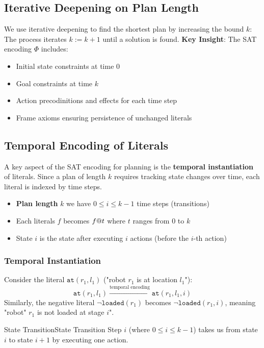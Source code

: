 \documentclass[a4paper]{article}
\theoremstyle{definition}
\begin{document}
\subsection{Iterative Deepening on Plan Length}
We use iterative deepening to find the shortest plan by increasing the bound \( k \):
The process iterates \( k := k + 1 \) until a solution is found. 
\vspace{1em}
\noindent
\newline
\textbf{Key Insight}: The SAT encoding \( \Phi \) includes:
\begin{itemize}
    \item Initial state constraints at time 0 
    \item Goal constraints at time \( k \)     
    \item Action precodinitions and effects for each time step 
    \item Frame axioms ensuring persistence of unchanged literals
\end{itemize}
\subsection{Temporal Encoding of Literals}
A key aspect of the SAT encoding for planning is the \textbf{temporal instantiation} of literals. Since a plan of length \( k \) requires tracking 
state changes over time, each literal is indexed by time steps.
\begin{itemize}
    \item \textbf{Plan length} \( k \) we have \( 0 \leq i \leq k - 1 \) time steps (transitions)
    \item Each literals \( f \) becomes \( f\symbol{64}t \) where \( t \) ranges from \( 0 \) to \( k \)     
    \item State \( i \) is the state after executing \( i \) actions (before the \( i \)-th action)
\end{itemize}
\subsubsection{Temporal Instantiation}
Consider the literal \( \texttt{at}(r_1, l_1) \) ("robot \( r_1 \) is at location \( l_1 \)"):
\[
  \texttt{at}(r_1, l_1) \xrightarrow{\text{temporal encoding}} \texttt{at}(r_1, l_1, i)
\]
Similarly, the negative literal \( \lnot \texttt{loaded}(r_1) \) becomes \( \lnot \texttt{loaded}(r_1, i) \), meaning "robot" \( r_1 \) is not 
loaded at stage \( i \)".
\begin{definition}{State Transition}{State Transition}
Step \( i \) (where $0 \leq i \leq k - 1$) takes us from state \( i \) to state \( i + 1 \) by executing one action.
\end{definition}
\end{document}
